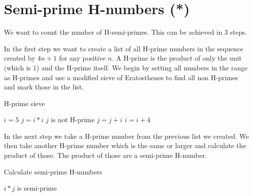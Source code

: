 \documentclass[11pt,a4paper,twoside]{article}
\begin{document}
\section{Semi-prime H-numbers (*)}
We want to count the number of H-semi-primes. This can be achieved in $3$ steps.

In the first step we want to create a list of all H-prime numbers in the
sequence created by $4n + 1$ for any positive $n$. A H-prime is the product of
only the unit (which is $1$) and the H-prime itself. We begin by setting all
numbers in the range as H-primes and use a modified sieve of Eratosthenes to
find all non H-primes and mark those in the list.


\begin{algorithm}
    \caption{H-prime sieve}
    \label{H-prime sieve}
    \begin{algorithmic}
        \STATE $i = 5$
                \STATE $j = i*i$
                    \STATE $j$ is not H-prime %
                    \STATE $j = j + i$
                \ENDWHILE
            \ENDIF
            \STATE $i = i + 4$
        \ENDWHILE
    \end{algorithmic}
\end{algorithm}

In the next step we take a H-prime number from the previous list we created. We
then take another H-prime number which is the same or larger and calculate the
product of those. The product of those are a semi-prime H-number.

%
\begin{algorithm}
    \caption{Calculate semi-prime H-numbers}
    \label{Semi-prime H-numbers}
    \begin{algorithmic}
                \STATE $i * j$ is semi-prime
            \ENDFOR
        \ENDFOR
    \end{algorithmic}
\end{algorithm}
\end{document}
